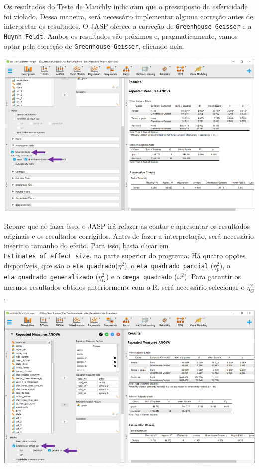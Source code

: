 \documentclass[
]{book}
\begin{document}
Os resultados do Teste de Mauchly indicaram que o pressuposto da esfericidade foi violado. Dessa maneira, será necessário implementar alguma correção antes de interpretar os resultados. O JASP oferece a correção de \texttt{Greenhouse-Geisser} e a \texttt{Huynh-Feldt}. Ambos os resultados são próximos e, pragmaticamente, vamos optar pela correção de \texttt{Greenhouse-Geisser}, clicando nela.

\includegraphics{./img/cap_anovarm_esfericidade2.png}

Repare que ao fazer isso, o JASP irá refazer as contas e apresentar os resultados originais e os resultados corrigidos. Antes de fazer a interpretação, será necessário inserir o tamanho do efeito. Para isso, basta clicar em \texttt{Estimates\ of\ effect\ size}, na parte superior do programa. Há quatro opções disponíveis, que são o \texttt{eta\ quadrado}(\(\eta^2\)), o \texttt{eta\ quadrado\ parcial} (\(\eta^2_p\)), o \texttt{eta\ quadrado\ generalizado} (\(\eta^2_G\)) e o \texttt{omega\ quadrado} (\(\omega^2\)). Para garantir os mesmos resultados obtidos anteriormente com o R, será necessário selecionar o \(\eta^2_G\).

\includegraphics{./img/cap_anovarm_tamanho_do_efeito.png}
\end{document}

